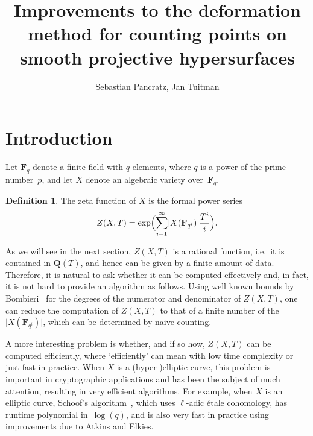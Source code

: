 \documentclass[a4paper,11pt]{article}
\author{Sebastian Pancratz, Jan Tuitman}
\title{Improvements to the deformation method for counting points 
on smooth projective hypersurfaces}
\numberwithin{equation}{section}
\providecommand{\card}[1]{\lvert#1\rvert}                %
\newcommand{\QQ}{\mathbf{Q}} %
\newcommand{\FF}{\mathbf{F}} %
\theoremstyle{definition}
\newtheorem{defn}[thm]{Definition}
\begin{document}
\maketitle


\bigskip %

\setcounter{tocdepth}{2}
\tableofcontents

\bigskip


\section{Introduction}
\label{sec:Introduction}

Let $\FF_q$ denote a finite field with $q$ elements, where $q$ is a power of 
the prime number~$p$, and let $X$ denote an algebraic variety over~$\FF_q$. 

\begin{defn}
The zeta function of $X$ is the formal power series
\[
Z(X,T) = \exp \Bigl(\sum_{i=1}^{\infty} \card{X(\FF_{q^i})} \frac{T^i}{i} \Bigr).
\]
\end{defn}

As we will see in the next section, $Z(X,T)$ 
is a rational function, i.e.\ it is contained in $\QQ(T)$, and 
hence can be given by a finite amount of data. Therefore, it is natural 
to ask whether it can be computed effectively and, in fact, it is not 
hard to provide an algorithm as follows. Using well known bounds 
by Bombieri~\citep{Bombieri1966} for the degrees of the numerator and 
denominator of $Z(X,T)$, one can reduce the computation of $Z(X,T)$ to that 
of a finite number of the $\card{X(\FF_{q^i})}$, which can be determined 
by naive counting.

A more interesting problem is whether, and if so how, $Z(X,T)$ can be 
computed efficiently, where `efficiently' can mean with low time complexity 
or just fast in practice. When $X$ is a (hyper-)elliptic curve, this problem
is important in cryptographic applications and has been the subject of 
much attention, resulting in very efficient algorithms.  For example, when 
$X$ is an elliptic curve, Schoof's algorithm~\citep{Schoof1995}, which uses 
$\ell$-adic \'etale cohomology, has runtime polynomial in~$\log(q)$, and is 
also very fast in practice using improvements due to Atkins and Elkies.
\end{document}
